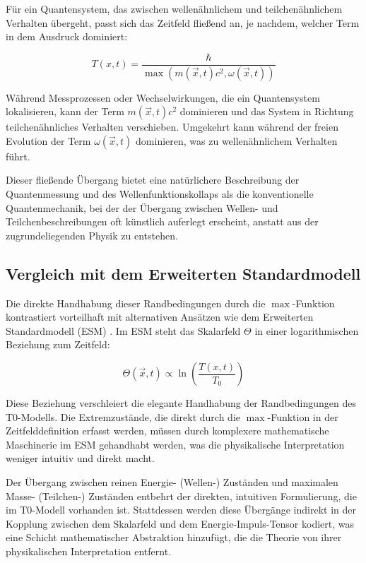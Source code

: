 \documentclass[12pt,a4paper]{article}
\newcommand{\Tfieldt}{T(x,t)}
\newcommand{\Tzero}{T_0}
\newcommand{\vecx}{\vec{x}}
\begin{document}
	Für ein Quantensystem, das zwischen wellenähnlichem und teilchenähnlichem Verhalten übergeht, passt sich das Zeitfeld fließend an, je nachdem, welcher Term in dem Ausdruck dominiert:
	
	\begin{equation}
		\Tfieldt = \frac{\hbar}{\max(m(\vecx,t)c^2, \omega(\vecx,t))}
		\label{eq:boundary_transition}
	\end{equation}
	
	Während Messprozessen oder Wechselwirkungen, die ein Quantensystem lokalisieren, kann der Term $m(\vecx,t)c^2$ dominieren und das System in Richtung teilchenähnliches Verhalten verschieben. Umgekehrt kann während der freien Evolution der Term $\omega(\vecx,t)$ dominieren, was zu wellenähnlichem Verhalten führt.
	
	Dieser fließende Übergang bietet eine natürlichere Beschreibung der Quantenmessung und des Wellenfunktionskollaps als die konventionelle Quantenmechanik, bei der der Übergang zwischen Wellen- und Teilchenbeschreibungen oft künstlich auferlegt erscheint, anstatt aus der zugrundeliegenden Physik zu entstehen.
	
	\subsection{Vergleich mit dem Erweiterten Standardmodell}
	\label{subsec:comparison_esm}
	
	Die direkte Handhabung dieser Randbedingungen durch die $\max$-Funktion kontrastiert vorteilhaft mit alternativen Ansätzen wie dem Erweiterten Standardmodell (ESM) \cite{pascher_standardmod_2025}. Im ESM steht das Skalarfeld $\Theta$ in einer logarithmischen Beziehung zum Zeitfeld:
	
	\begin{equation}
		\Theta(\vecx,t) \propto \ln\left(\frac{\Tfieldt}{\Tzero}\right)
		\label{eq:theta_relation}
	\end{equation}
	
	Diese Beziehung verschleiert die elegante Handhabung der Randbedingungen des T0-Modells. Die Extremzustände, die direkt durch die $\max$-Funktion in der Zeitfelddefinition erfasst werden, müssen durch komplexere mathematische Maschinerie im ESM gehandhabt werden, was die physikalische Interpretation weniger intuitiv und direkt macht.
	
	Der Übergang zwischen reinen Energie- (Wellen-) Zuständen und maximalen Masse- (Teilchen-) Zuständen entbehrt der direkten, intuitiven Formulierung, die im T0-Modell vorhanden ist. Stattdessen werden diese Übergänge indirekt in der Kopplung zwischen dem Skalarfeld und dem Energie-Impuls-Tensor kodiert, was eine Schicht mathematischer Abstraktion hinzufügt, die die Theorie von ihrer physikalischen Interpretation entfernt.
	
\end{document}

